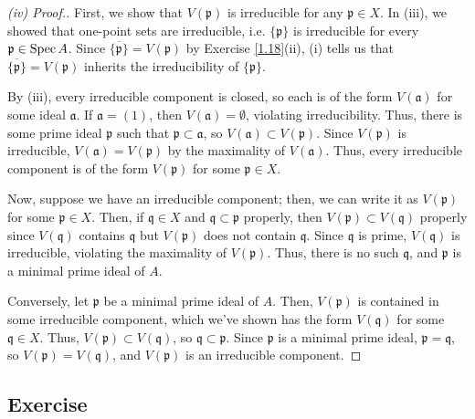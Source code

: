 \begin{proof}[(iv) Proof.]
First, we show that $V(\mathfrak{p})$ is irreducible for any $\mathfrak{p} \in X$. In (iii), we showed that one-point sets are irreducible, i.e. $\{\mathfrak{p}\}$ 
is irreducible for every $\mathfrak{p} \in \operatorname{Spec} A$. Since $\overline{\{\mathfrak{p}\}} = V(\mathfrak{p})$ by
Exercise \ref{1.18}(ii), (i) tells us that $\overline{\{\mathfrak{p}\}} = V(\mathfrak{p})$ inherits the irreducibility of $\{\mathfrak{p}\}$.

By (iii), every irreducible component is closed, so each is of the form $V(\mathfrak{a})$ for some ideal $\mathfrak{a}$. If $\mathfrak{a} = (1)$,
then $V(\mathfrak{a}) = \emptyset$, violating irreducibility. Thus, there is some prime ideal $\mathfrak{p}$ such that $\mathfrak{p} \subset \mathfrak{a}$, so
$V(\mathfrak{a}) \subset V(\mathfrak{p})$. Since $V(\mathfrak{p})$ is irreducible, $V(\mathfrak{a}) = V(\mathfrak{p})$ by the maximality of $V(\mathfrak{a})$.
Thus, every irreducible component is of the form $V(\mathfrak{p})$ for some $\mathfrak{p} \in X$.

Now, suppose we have an irreducible component; then, we can write it as $V(\mathfrak{p})$ for some $\mathfrak{p} \in X$. Then, if 
$\mathfrak{q} \in X$ and $\mathfrak{q} \subset \mathfrak{p}$ properly, then $V(\mathfrak{p}) \subset V(\mathfrak{q})$ properly since
$V(\mathfrak{q})$ contains $\mathfrak{q}$ but $V(\mathfrak{p})$ does not contain $\mathfrak{q}$. Since $\mathfrak{q}$ is prime, $V(\mathfrak{q})$ is irreducible,
violating the maximality of $V(\mathfrak{p})$. Thus, there is no such $\mathfrak{q}$, and $\mathfrak{p}$ is a minimal prime ideal of $A$.

Conversely, let $\mathfrak{p}$ be a minimal prime ideal of $A$. Then, $V(\mathfrak{p})$ is contained in some irreducible component, which we've shown 
has the form $V(\mathfrak{q})$ for some $\mathfrak{q} \in X$. Thus, $V(\mathfrak{p}) \subset V(\mathfrak{q})$, so $\mathfrak{q} \subset \mathfrak{p}$.
Since $\mathfrak{p}$ is a minimal prime ideal, $\mathfrak{p} = \mathfrak{q}$, so $V(\mathfrak{p}) = V(\mathfrak{q})$, and $V(\mathfrak{p})$ is an 
irreducible component.
\end{proof}

\subsection{Exercise}\label{1.21}

